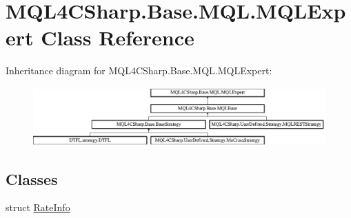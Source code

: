\hypertarget{class_m_q_l4_c_sharp_1_1_base_1_1_m_q_l_1_1_m_q_l_expert}{}\section{M\+Q\+L4\+C\+Sharp.\+Base.\+M\+Q\+L.\+M\+Q\+L\+Expert Class Reference}
\label{class_m_q_l4_c_sharp_1_1_base_1_1_m_q_l_1_1_m_q_l_expert}
Inheritance diagram for M\+Q\+L4\+C\+Sharp.\+Base.\+M\+Q\+L.\+M\+Q\+L\+Expert\+:\begin{figure}[H]
\begin{center}
\leavevmode
\includegraphics[height=2.242242cm]{class_m_q_l4_c_sharp_1_1_base_1_1_m_q_l_1_1_m_q_l_expert}
\end{center}
\end{figure}
\subsection*{Classes}
\begin{DoxyCompactItemize}
\item 
struct \hyperlink{struct_m_q_l4_c_sharp_1_1_base_1_1_m_q_l_1_1_m_q_l_expert_1_1_rate_info}{Rate\+Info}
\end{DoxyCompactItemize}
